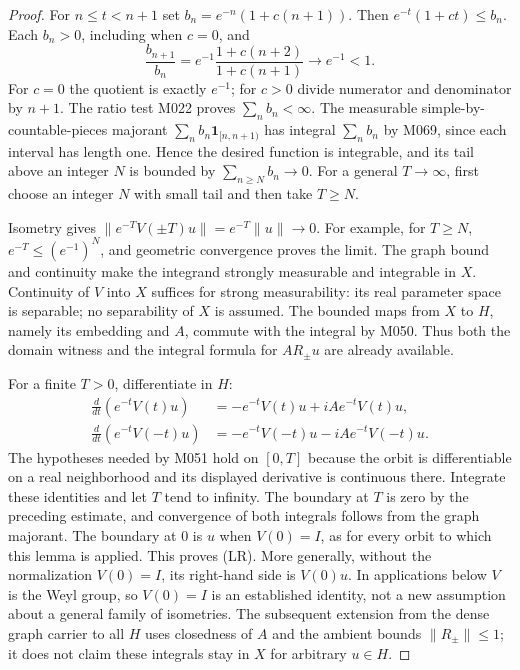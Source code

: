 \documentclass[11pt,a4paper]{article}
\theoremstyle{definition}
\theoremstyle{remark}
\begin{document}
\begin{proof}
For $n\leq t<n+1$ set
$b_n=e^{-n}(1+c(n+1))$. Then
$e^{-t}(1+ct)\leq b_n$. Each $b_n>0$, including when $c=0$, and
\[
 \frac{b_{n+1}}{b_n}
 =e^{-1}\frac{1+c(n+2)}{1+c(n+1)}\longrightarrow e^{-1}<1.
\]
For $c=0$ the quotient is exactly $e^{-1}$; for $c>0$ divide numerator
and denominator by $n+1$. The ratio test M022 proves $\sum_n b_n<\infty$.
The measurable simple-by-countable-pieces majorant
$\sum_n b_n\mathbf1_{[n,n+1)}$ has integral $\sum_n b_n$ by M069,
since each interval has length one. Hence the desired function is
integrable, and its tail above an integer $N$ is bounded by
$\sum_{n\geq N}b_n\to0$. For a general $T\to\infty$, first choose an
integer $N$ with small tail and then take $T\geq N$.

Isometry gives $\|e^{-T}V(\pm T)u\|=e^{-T}\|u\|\to0$.
For example, for $T\geq N$, $e^{-T}\leq(e^{-1})^N$, and geometric
convergence proves the limit. The graph bound and continuity make the
integrand strongly measurable and integrable in $X$. Continuity of
$V$ into $X$ suffices for strong measurability: its real parameter space
is separable; no separability of $X$ is assumed. The bounded maps from
$X$ to $H$, namely its embedding and $A$, commute with the integral
by M050. Thus both the domain witness and the integral formula for
$AR_\pm u$ are already available.

For a finite $T>0$, differentiate in $H$:
\[
 \begin{split}
 \tfrac d{dt}(e^{-t}V(t)u)&=-e^{-t}V(t)u+iAe^{-t}V(t)u,\\
 \tfrac d{dt}(e^{-t}V(-t)u)&=-e^{-t}V(-t)u-iAe^{-t}V(-t)u.
 \end{split}
\]
The hypotheses needed by M051 hold on $[0,T]$ because the orbit is
differentiable on a real neighborhood and its displayed derivative is
continuous there. Integrate these identities and let $T$ tend to
infinity. The boundary at $T$ is zero by the preceding estimate, and
convergence of both integrals follows from the graph majorant. The
boundary at $0$ is $u$ when $V(0)=I$, as for every orbit to which this
lemma is applied. This proves (LR). More generally, without the
normalization $V(0)=I$, its right-hand side is $V(0)u$.
In applications below $V$ is the Weyl group, so $V(0)=I$ is an established
identity, not a new assumption about a general family of isometries.
The subsequent extension from the dense graph carrier to all $H$ uses
closedness of $A$ and the ambient bounds $\|R_\pm\|\leq1$; it does
not claim these integrals stay in $X$ for arbitrary $u\in H$.
\end{proof}
\end{document}

